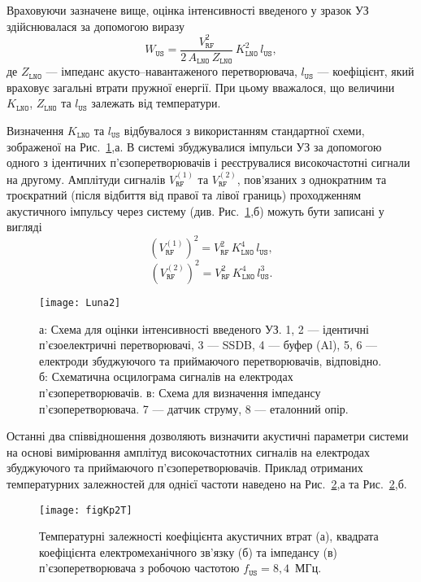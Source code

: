 \documentclass[a4paper,14pt,oneside,openany]{memoir}
\begin{document}
Враховуючи зазначене вище, оцінка інтенсивності введеного у зразок УЗ здійснювалася за допомогою виразу
 \begin{equation}
 \label{eqWus2}
 W_\mathtt{US}=\frac{V_\mathtt{RF}^2}{2\,A_\mathtt{LNO}\,Z_\mathtt{LNO}}\,K_\mathtt{LNO}^2\,l_\mathtt{US},
 \end{equation}
де
$Z_\mathtt{LNO}$ --- імпеданс акусто--навантаженого перетворювача,
$l_\mathtt{US}$ --- коефіцієнт, який враховує загальні втрати пружної енергії.
При цьому вважалося, що величини
$K_\mathtt{LNO}$, $Z_\mathtt{LNO}$ та $l_\mathtt{US}$ залежать від температури.

Визначення $K_\mathtt{LNO}$ та $l_\mathtt{US}$ відбувалося з використанням стандартної схеми,
зображеної на Рис.~\ref{Luna2},а.
В системі збуджувалися імпульси УЗ за допомогою одного з ідентичних п'єзоперетворювачів і реєструвалися
високочастотні сигнали на другому.
Амплітуди сигналів $V_\mathtt{RF}^{(1)}$ та $V_\mathtt{RF}^{(2)}$, пов'язаних з однократним та троєкратний (після відбиття від правої та лівої границь) проходженням акустичного імпульсу через систему
(див. Рис.~\ref{Luna2},б) можуть бути записані у вигляді
 \begin{equation}
 \label{eqVrf1}
 (V_\mathtt{RF}^{(1)})^2=V_\mathtt{RF}^2\,K_\mathtt{LNO}^4\,l_\mathtt{US},
 \end{equation}
 \begin{equation}
 \label{eqVrf2}
 (V_\mathtt{RF}^{(2)})^2=V_\mathtt{RF}^2\,K_\mathtt{LNO}^4\,l_\mathtt{US}^3.
 \end{equation}

\begin{figure}
\center
\texttt{[image: Luna2]}%
\caption{\label{Luna2}
а: Схема для оцінки інтенсивності введеного УЗ.
1, 2 --- ідентичні п'єзоелектричні перетворювачі,
3 --- SSDB,
4 --- буфер (Al),
5, 6 --- електроди збуджуючого та приймаючого перетворювачів, відповідно.
б: Схематична осцилограма сигналів на електродах п'єзоперетворювачів.
в: Схема для визначення імпедансу п'єзоперетворювача.
7 --- датчик струму,
8 --- еталонний опір.
}
\end{figure}

Останні два співвідношення дозволяють визначити акустичні параметри системи на основі вимірювання амплітуд
високочастотних сигналів на електродах збуджуючого та приймаючого п'єзоперетворювачів.
Приклад отриманих температурних залежностей для однієї частоти наведено на Рис.~\ref{figKp2T},а та Рис.~\ref{figKp2T},б.

\begin{figure}
\center
\texttt{[image: figKp2T]}%
\caption{\label{figKp2T}
Температурні залежності коефіцієнта акустичних втрат (а),
квадрата коефіцієнта електромеханічного зв'язку (б) та
імпедансу (в) п'єзоперетворювача з робочою частотою $f_\mathtt{US}=8,4$~МГц.
}
\end{figure}
\end{document}
